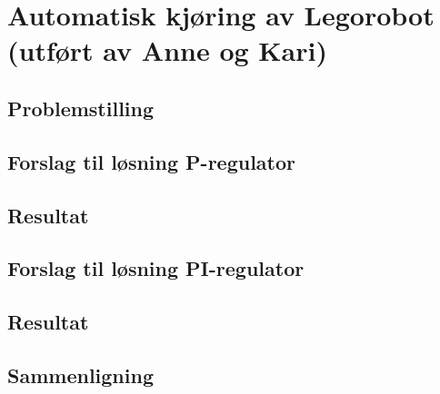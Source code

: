 

\chapter{Automatisk kjøring av Lego\-robot 
  (utført av Anne og Kari)}\label{kap:prosjekt05}


\section{Problemstilling}


\section{Forslag til løsning P-regulator}

\section{Resultat}

\section{Forslag til løsning PI-regulator}

\section{Resultat}

\section{Sammenligning}
